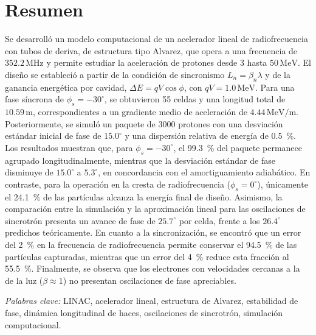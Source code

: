 \pagestyle{empty}

\chapter*{Resumen}
\thispagestyle{empty}


Se desarrolló un modelo computacional de un acelerador
lineal de radiofrecuencia con tubos de deriva, de estructura
tipo Alvarez, que opera a una frecuencia de
$352.2\,\mathrm{MHz}$ y permite estudiar la aceleración de
protones desde $3$ hasta $50\,\mathrm{MeV}$. El diseño se
estableció a partir de la condición de sincronismo
$L_n=\beta_n\lambda$ y de la ganancia energética por cavidad,
$\Delta E=qV\cos\phi$, con $qV=1.0\,\mathrm{MeV}$.
Para una fase síncrona de $\phi_s=-30^\circ$, se obtuvieron
55 celdas y una longitud total de $10.59\,\mathrm{m}$,
correspondientes a un gradiente medio de aceleración de
$4.44\,\mathrm{MeV/m}$. Posteriormente, se simuló un paquete
de 3000 protones con una desviación estándar inicial de fase
de $15.0^\circ$ y una dispersión relativa de energía de
\SI{0.5}{\percent}. Los resultados muestran que, para
$\phi_s=-30^\circ$, el \SI{99.3}{\percent} del paquete
permanece agrupado longitudinalmente, mientras que la
desviación estándar de fase disminuye de $15.0^\circ$
a $5.3^\circ$, en concordancia con el amortiguamiento
adiabático. En contraste, para la operación en la cresta
de radiofrecuencia ($\phi_s=0^\circ$), únicamente el
\SI{24.1}{\percent} de las partículas alcanza la energía
final de diseño. Asimismo, la comparación entre la
simulación y la aproximación lineal para las oscilaciones
de sincrotrón presenta un avance de fase de $25.7^\circ$
por celda, frente a los $26.4^\circ$ predichos
teóricamente. En cuanto a la sincronización, se encontró
que un error del \SI{2}{\percent} en la frecuencia de
radiofrecuencia permite conservar el \SI{94.5}{\percent}
de las partículas capturadas, mientras que un error del
\SI{4}{\percent} reduce esta fracción al
\SI{55.5}{\percent}. Finalmente, se observa que los
electrones con velocidades cercanas a la de la luz
($\beta\approx 1$) no presentan oscilaciones de fase
apreciables.

\vspace{6pt}

\noindent
\hspace*{0.5in}
\textit{Palabras clave:}
LINAC, acelerador lineal, estructura de Alvarez, estabilidad de fase,
dinámica longitudinal de haces, oscilaciones de sincrotrón,
simulación computacional.


